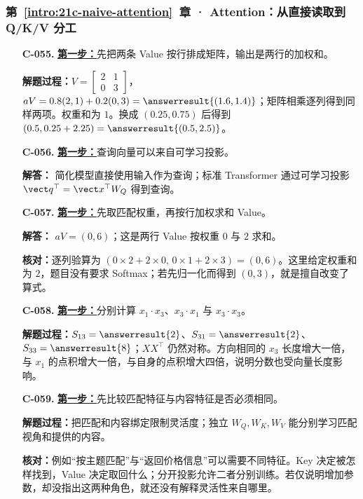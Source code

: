 \subsubsection*{第~\ref*{intro:21c-naive-attention}~章 · Attention：从直接读取到 Q/K/V 分工}
\begin{enumerate}[label={},leftmargin=4.8em,itemsep=4pt]
\item[\textbf{C-055.}] \leavevmode{}\label{solution:C-055}\label{solution:weighted-value-read}\hyperref[exercise:weighted-value-read]{\textbf{第一步：}}先把两条 Value 按行排成矩阵，输出是两行的加权和。\par\nobreak
\textbf{解题过程：}$V=\begin{bmatrix}2&1\\0&3\end{bmatrix}$，$aV=0.8(2,1)+0.2(0,3)=\answerresult{(1.6,1.4)}$；矩阵相乘逐列得到同样两项。权重和为 $1$。换成 $(0.25,0.75)$ 后得到 $(0.5,0.25+2.25)=\answerresult{(0.5,2.5)}$。
\item[\textbf{C-056.}] \leavevmode{}\label{solution:C-056}\label{solution:query-projection-choice}\hyperref[exercise:query-projection-choice]{\textbf{第一步：}}查询向量可以来自可学习投影。\par\nobreak
\textbf{解答：} 简化模型直接使用输入作为查询；标准 Transformer 通过可学习投影 $\vect q^\top=\vect x^\top W_Q$ 得到查询。
\item[\textbf{C-057.}] \leavevmode{}\label{solution:C-057}\label{solution:unnormalized-value-read}\hyperref[exercise:unnormalized-value-read]{\textbf{第一步：}}先取匹配权重，再按行加权求和 Value。\par\nobreak
\textbf{解答：} $aV=(0,6)$；这是两行 Value 按权重 $0$ 与 $2$ 求和。\par\textbf{核对：}逐列验算为 $(0\times2+2\times0,\,0\times1+2\times3)=(0,6)$。这里给定权重和为 $2$，题目没有要求 Softmax；若先归一化而得到 $(0,3)$，就是擅自改变了算式。
\item[\textbf{C-058.}] \leavevmode{}\label{solution:C-058}\label{solution:self-dot-length}\hyperref[exercise:self-dot-length]{\textbf{第一步：}}分别计算 $x_1\cdot x_3$、$x_3\cdot x_1$ 与 $x_3\cdot x_3$。\par\nobreak\textbf{解题过程：}$S_{13}=\answerresult{2}$、$S_{31}=\answerresult{2}$、$S_{33}=\answerresult{8}$；$XX^\top$ 仍然对称。方向相同的 $x_3$ 长度增大一倍，与 $x_1$ 的点积增大一倍，与自身的点积增大四倍，说明分数也受向量长度影响。
\item[\textbf{C-059.}] \leavevmode{}\label{solution:C-059}\label{solution:key-value-projections}\hyperref[exercise:key-value-projections]{\textbf{第一步：}}先比较匹配特征与内容特征是否必须相同。\par\nobreak\textbf{解题过程：}把匹配和内容绑定限制灵活度；独立 $W_Q,W_K,W_V$ 能分别学习匹配视角和提供的内容。\par\textbf{核对：}例如“按主题匹配”与“返回价格信息”可以需要不同特征。Key 决定被怎样找到，Value 决定取回什么；分开投影允许二者分别训练。若仅说明增加参数，却没指出这两种角色，就还没有解释灵活性来自哪里。
\end{enumerate}
